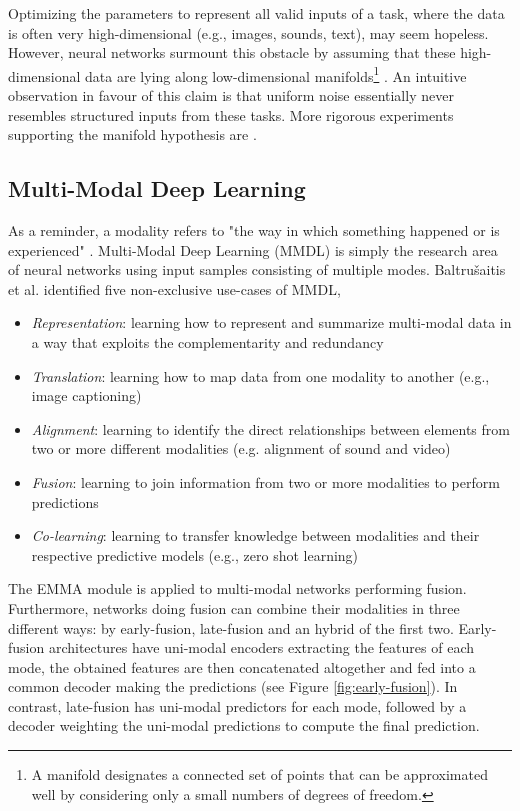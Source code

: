 Optimizing the parameters to represent all valid inputs of a task, where the data is often very high-dimensional (e.g., images, sounds, text), may seem hopeless. However, neural networks surmount this obstacle by assuming that these high-dimensional data are lying along low-dimensional manifolds\footnote{A manifold designates a connected set of points that can be approximated well by considering only a small numbers of degrees of freedom.} \citep{goodfellow-book}. An intuitive observation in favour of this claim is that uniform noise essentially never resembles structured inputs from these tasks. More rigorous experiments supporting the manifold hypothesis are \citep{manifold-1, manifold-2, manifold-3}.


\subsection*{Multi-Modal Deep Learning}\label{sec:mmdl}
As a reminder, a modality refers to "the way in which something happened or is experienced" \citep{taxomany-multimodal}. Multi-Modal Deep Learning (MMDL) is simply the research area of neural networks using input samples consisting of multiple modes. Baltrušaitis et al. identified five non-exclusive use-cases of MMDL,
\begin{itemize}
\item \textit{Representation}: learning how to represent and summarize multi-modal data in a way that exploits the complementarity and redundancy
\item \textit{Translation}: learning how to map data from one modality to another (e.g., image captioning)
\item \textit{Alignment}: learning to identify the direct relationships between elements from two or more different modalities (e.g. alignment of sound and video)
\item \textit{Fusion}: learning to join information from two or more modalities to perform predictions 
\item \textit{Co-learning}: learning to transfer knowledge between modalities and their respective predictive models (e.g., zero shot learning)
\end{itemize}
The EMMA module is applied to multi-modal networks performing fusion. Furthermore, networks doing fusion can combine their modalities in three different ways: by early-fusion, late-fusion and an hybrid of the first two. Early-fusion architectures have uni-modal encoders extracting the features of each mode, the obtained features are then concatenated altogether and fed into a common decoder making the predictions (see Figure \ref{fig:early-fusion}). In contrast, late-fusion has uni-modal predictors for each mode, followed by a decoder weighting the uni-modal predictions to compute the final prediction. 
